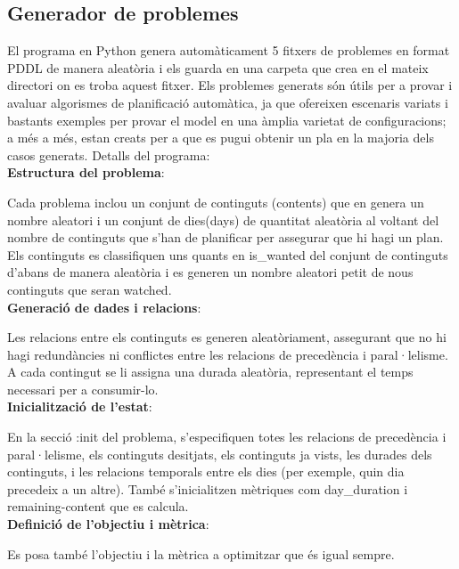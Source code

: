 \documentclass[a4paper]{article}
\begin{document}
	
	
	\subsection{Generador de problemes}	
	
	El programa en Python genera automàticament 5 fitxers de problemes en format PDDL de manera aleatòria i els guarda en una carpeta que crea en el mateix directori on es troba aquest fitxer. Els problemes generats són útils per a provar i avaluar algorismes de planificació automàtica, ja que ofereixen escenaris variats i bastants exemples per provar el model  en una àmplia varietat de configuracions; a més a més, estan creats per a que es pugui obtenir un pla en la majoria dels casos generats. 
	Detalls del programa: \\
	
	\noindent \textbf{Estructura del problema}:
	
	Cada problema inclou un conjunt de continguts (contents) que en genera un nombre aleatori  i un conjunt de dies(days) de quantitat aleatòria al voltant del nombre de continguts que s'han de planificar per assegurar que hi hagi un plan. Els continguts es classifiquen uns quants en is\_wanted del conjunt de continguts d'abans de manera aleatòria i es generen un nombre aleatori petit de nous continguts que seran watched. \\
	
	\noindent \textbf{Generació de dades i relacions}:
	
	Les relacions entre els continguts es generen aleatòriament, assegurant que no hi hagi redundàncies ni conflictes entre les relacions de precedència i paral·lelisme. A cada contingut se li assigna una durada aleatòria, representant el temps necessari per a consumir-lo. \\
	
	\noindent \textbf{Inicialització de l'estat}:
	
	En la secció :init del problema, s'especifiquen totes les relacions de precedència i paral·lelisme, els continguts desitjats, els continguts ja vists, les durades dels continguts, i les relacions temporals entre els dies (per exemple, quin dia precedeix a un altre). També s'inicialitzen mètriques com day\_duration i remaining-content que es calcula. \\
	
	\noindent \textbf{Definició de l'objectiu i mètrica}:
	
	Es posa també l'objectiu i la mètrica a optimitzar que és igual sempre.	
	
\end{document}
